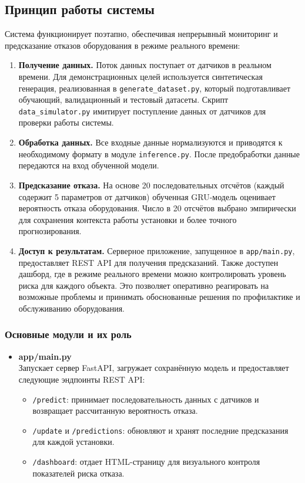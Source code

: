 \documentclass[a4paper,12pt]{article}
\begin{document}
\begin{flushleft}
\subsection{Принцип работы системы}

Система функционирует поэтапно, обеспечивая непрерывный мониторинг и предсказание отказов оборудования в режиме реального времени:

\begin{enumerate}
    \item \textbf{Получение данных.}
    Поток данных поступает от датчиков в реальном времени. Для демонстрационных целей используется синтетическая генерация, реализованная в \texttt{generate\_dataset.py}, который подготавливает обучающий, валидационный и тестовый датасеты. Скрипт \texttt{data\_simulator.py} имитирует поступление данных от датчиков для проверки работы системы.

    \item \textbf{Обработка данных.}
    Все входные данные нормализуются и приводятся к необходимому формату в модуле \texttt{inference.py}. После предобработки данные передаются на вход обученной модели.

    \item \textbf{Предсказание отказа.}
    На основе 20 последовательных отсчётов (каждый содержит 5 параметров от датчиков) обученная GRU-модель оценивает вероятность отказа оборудования. Число в 20 отсчётов выбрано эмпирически для сохранения контекста работы установки и более точного прогнозирования.

    \item \textbf{Доступ к результатам.}
    Серверное приложение, запущенное в \texttt{app/main.py}, предоставляет REST API для получения предсказаний. Также доступен дашборд, где в режиме реального времени можно контролировать уровень риска для каждого объекта. Это позволяет оперативно реагировать на возможные проблемы и принимать обоснованные решения по профилактике и обслуживанию оборудования.
\end{enumerate}

\subsubsection{Основные модули и их роль}

\begin{itemize}
    \item \textbf{app/main.py} \\
    Запускает сервер FastAPI, загружает сохранённую модель и предоставляет следующие эндпоинты REST API:
    \begin{itemize}
        \item \texttt{/predict}: принимает последовательность данных с датчиков и возвращает рассчитанную вероятность отказа.
        \item \texttt{/update} и \texttt{/predictions}: обновляют и хранят последние предсказания для каждой установки.
        \item \texttt{/dashboard}: отдает HTML-страницу для визуального контроля показателей риска отказа.
    \end{itemize}


\end{itemize}
\end{flushleft}
\end{document}
